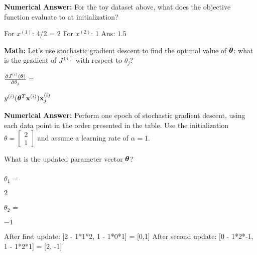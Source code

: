 \begin{parts}
\begin{subparts}
\subpart[1] \textbf{Numerical Answer:} For the toy dataset above, what does the objective function evaluate to at initialization? 
\begin{tcolorbox}[fit,height=1.5cm, width=3cm, blank, borderline={1pt}{-2pt}]
    \begin{soln}
        For $x^{(1)}$: 4/2 = 2
        For $x^{(2)}$: 1
        Ans: 1.5
    \end{soln}
\end{tcolorbox}

\subpart[2] \textbf{Math:} Let's use stochastic gradient descent to find the optimal value of $\boldsymbol \theta$: what is the gradient of $J^{(i)}$ with respect to $\theta_j$? 

$\frac{ \partial J^{(i)}(\boldsymbol \theta) }{ \partial \theta_j}=$  \begin{tcolorbox}[fit,height=1.5cm, width=6cm, blank, borderline={1pt}{-2pt}, nobeforeafter]
    \begin{soln}
        $y^{(i)}(\boldsymbol \theta^T\mathbf{x}^{(i)})\mathbf{x}^{(i)}_j$
    \end{soln}
\end{tcolorbox} 

\subpart[2] \textbf{Numerical Answer:} Perform one epoch of stochastic gradient descent, using each data point in the order presented in the table. Use the initialization $\theta = \begin{bmatrix} 2 \\ 1 \end{bmatrix}$ and assume a learning rate of $\alpha=1$. 

What is the updated parameter vector $\boldsymbol \theta$?
\\ \\
$\theta_1$ = \begin{tcolorbox}[fit,height=1.5cm, width=3cm, blank, borderline={1pt}{-2pt}, nobeforeafter]
    \begin{soln}
        $2$
    \end{soln}
\end{tcolorbox}

$\theta_2$ = \begin{tcolorbox}[fit,height=1.5cm, width=3cm, blank, borderline={1pt}{-2pt}, nobeforeafter]
    \begin{soln}
        $-1$
    \end{soln}
\end{tcolorbox}

\begin{soln}
    After first update: [2 - 1*1*2, 1 - 1*0*1] = [0,1]
    After second update: [0 - 1*2*-1, 1 - 1*2*1]  = [2, -1]
\end{soln}


\end{subparts}
\end{parts}
